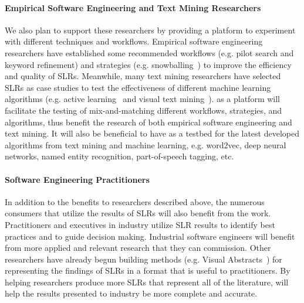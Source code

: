 \paragraph{Empirical Software Engineering and Text Mining Researchers}
We also plan to support these researchers by providing a platform to experiment  with  different techniques  and  workflows. Empirical software engineering researchers have established some recommended workflows (e.g. pilot search and keyword refinement) and strategies (e.g. snowballing~\cite{jalali2012systematic}) to improve the efficiency and quality of SLRs. Meanwhile, many text mining researchers have selected SLRs as case studies to test the effectiveness of different machine learning algorithms (e.g. active learning~\cite{Yu2018} and visual text mining~\cite{Felizardo2010An}). {\IT} as a platform will facilitate the testing of mix-and-matching different workflows, strategies, and algorithms, thus benefit the research of both empirical software engineering and text mining. It will also be beneficial to have {\IT} as a testbed for the latest developed algorithms from text mining and machine learning, e.g. word2vec, deep neural networks, named entity recognition, part-of-speech tagging, etc.

\vspace{8pt}
\paragraph{Software Engineering Practitioners}
In addition to the benefits to researchers described above, the numerous consumers that utilize the results of SLRs will also benefit from the work.  
Practitioners and executives in industry utilize SLR results to identify best practices and to guide decision making.  
Industrial software engineers will benefit from more applied and relevant research that they can commission.
Other researchers have already begun building methods (e.g. Visual Abstracts~\cite{VisualAbstracts}) for representing the findings of SLRs in a format that is useful to practitioners.
By helping researchers produce more SLRs that represent all of the literature, {\IT} will help the results presented to industry be more complete and accurate.

